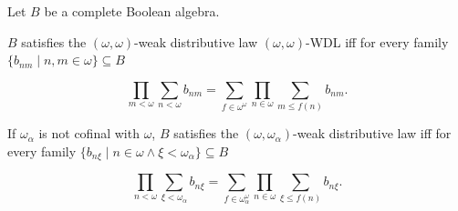 Let $B$ be a complete Boolean algebra.

$B$ satisfies the $(\omega, \omega)$-weak distributive law $(\omega, \omega)$-WDL iff for every family $\{b_{nm} \mid n, m \in \omega\} \subseteq B$

$$\prod_{m < \omega} \sum_{n < \omega} b_{nm} = \sum_{f \in \omega^{\omega}} \prod_{n \in \omega} \sum_{m \leq f(n)} b_{nm}.$$

If $\omega_{\alpha}$ is not cofinal with $\omega$, $B$ satisfies the $(\omega, \omega_{\alpha})$-weak distributive law iff for every family $\{b_{n\xi} \mid n \in \omega \land \xi < \omega_{\alpha}\} \subseteq B$

$$\prod_{n < \omega} \sum_{\xi < \omega_{\alpha}} b_{n\xi} = \sum_{f \in \omega_{\alpha}^{\omega}} \prod_{n \in \omega} \sum_{\xi \leq f(n)} b_{n\xi}.$$
